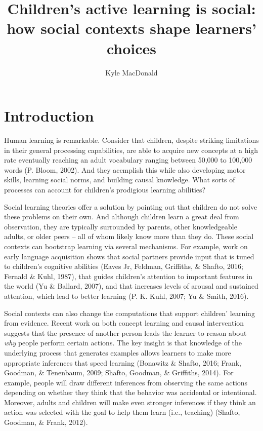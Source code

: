 \documentclass[a4paper,man,apacite,floatsintext]{apa6}
\date{}
\title{\textbf{Children's active learning is social: how social contexts shape
learners' choices}}
\author{Kyle MacDonald}
\affiliation{Department of Psychology, Stanford University}
\begin{document}
\maketitle

\section{Introduction}\label{introduction}

Human learning is remarkable. Consider that children, despite striking
limitations in their general processing capabilities, are able to
acquire new concepts at a high rate eventually reaching an adult
vocabulary ranging between 50,000 to 100,000 words (P. Bloom, 2002). And
they accmplish this while also developing motor skills, learning social
norms, and building causal knowledge. What sorts of processes can
account for children's prodigious learning abilities?

Social learning theories offer a solution by pointing out that children
do not solve these problems on their own. And although children learn a
great deal from observation, they are typically surrounded by parents,
other knowledgeable adults, or older peers -- all of whom likely know
more than they do. These social contexts can bootstrap learning via
several mechanisms. For example, work on early language acquisition
shows that social partners provide input that is tuned to children's
cognitive abilities (Eaves Jr, Feldman, Griffiths, \& Shafto, 2016;
Fernald \& Kuhl, 1987), that guides children's attention to important
features in the world (Yu \& Ballard, 2007), and that increases levels
of arousal and sustained attention, which lead to better learning (P. K.
Kuhl, 2007; Yu \& Smith, 2016).

Social contexts can also change the computations that support children'
learning from evidence. Recent work on both concept learning and causal
intervention suggests that the presence of another person leads the
learner to reason about \emph{why} people perform certain actions. The
key insight is that knowledge of the underlying process that generates
examples allows learners to make more appropriate inferences that speed
learning (Bonawitz \& Shafto, 2016; Frank, Goodman, \& Tenenbaum, 2009;
Shafto, Goodman, \& Griffiths, 2014). For example, people will draw
different inferences from observing the same actions depending on
whether they think that the behavior was accidental or intentional.
Moreover, adults and children will make even stronger inferences if they
think an action was selected with the goal to help them learn (i.e.,
teaching) (Shafto, Goodman, \& Frank, 2012).
\end{document}
